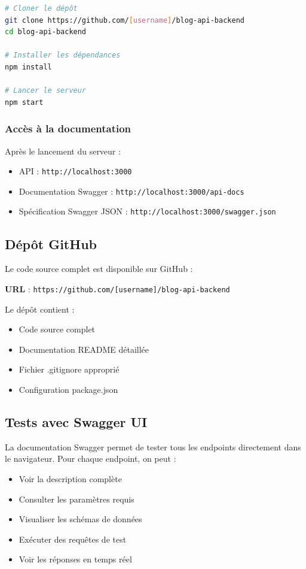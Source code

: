 \documentclass[12pt,a4paper]{article}
\begin{document}
\begin{lstlisting}[language=bash]
# Cloner le dépôt
git clone https://github.com/[username]/blog-api-backend
cd blog-api-backend

# Installer les dépendances
npm install

# Lancer le serveur
npm start
\end{lstlisting}

\subsubsection{Accès à la documentation}

Après le lancement du serveur :
\begin{itemize}
    \item API : \texttt{http://localhost:3000}
    \item Documentation Swagger : \texttt{http://localhost:3000/api-docs}
    \item Spécification Swagger JSON : \texttt{http://localhost:3000/swagger.json}
\end{itemize}

\subsection{Dépôt GitHub}

Le code source complet est disponible sur GitHub :

\textbf{URL} : \texttt{https://github.com/[username]/blog-api-backend}

Le dépôt contient :
\begin{itemize}
    \item Code source complet
    \item Documentation README détaillée
    \item Fichier .gitignore approprié
    \item Configuration package.json
\end{itemize}

\subsection{Tests avec Swagger UI}

La documentation Swagger permet de tester tous les endpoints directement dans le navigateur. Pour chaque endpoint, on peut :
\begin{itemize}
    \item Voir la description complète
    \item Consulter les paramètres requis
    \item Visualiser les schémas de données
    \item Exécuter des requêtes de test
    \item Voir les réponses en temps réel
\end{itemize}
\end{document}
